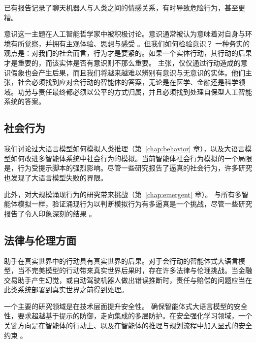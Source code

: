 已有报告记录了聊天机器人与人类之间的情感关系，有时导致危险行为，甚至更糟。

意识这一主题在人工智能哲学家中被积极讨论。意识通常被认为意味着对自身与环境有所觉察，并拥有主观体验、思想与感受 \citep{velmans2009understanding,butlin2023consciousness}。但我们如何检验意识？
一种务实的观点是：对我们的社会而言，行为才是要紧的。如果一个实体行动，其行动的后果才是重要的，而该实体是否有意识则不那么重要。\citet{bengio2025illusions} 主张，仅仅通过行动造成的意识假象也会产生后果，而且我们将越来越难以辨别有意识与无意识的实体。他们主张，社会必须找到应对会行动的智能体的答案，无论是在医学、金融还是科学领域。功劳与责任最终都必须以公平的方式归属，并且必须找到处理自保型人工智能系统的答案。%

\subsection{社会行为}
我们讨论过大语言模型如何模拟人类推理（第~\ref{chap:behavior} 章），以及大语言模型如何改进多智能体系统中社会行为的模拟。当前智能体社会行为模拟的一个局限是，行为受提示脚本的强烈影响。尽管一些研究报告了逼真的社会行为，许多研究也发现了大语言模型失败的界限。

此外，对大规模涌现行为的研究带来挑战（第~\ref{chap:emergent} 章）。
与所有多智能体模拟一样，验证涌现行为以判断模拟行为有多逼真是一个挑战，尽管一些研究报告了令人印象深刻的结果 \citep{park2024generative}。%

\subsection{法律与伦理方面}
助手在真实世界中的行动具有真实世界的后果。对于会行动的智能体式大语言模型，当不完美模型的行动带来真实世界后果时，存在许多法律与伦理挑战。当金融交易助手产生幻觉，或自动驾驶机器人做出错误推断时，责任与赔偿的问题应当在此类系统部署到真实世界之前得到处理。


一个主要的研究领域是在技术层面提升安全性。
确保智能体式大语言模型的安全性，要求超越基于提示的防御，走向集成的多层防护。在安全强化学习领域，一个关键方向是在智能体的行动上、以及在智能体的推理与规划流程中加入显式的安全约束 \citep{gu2024review}。

